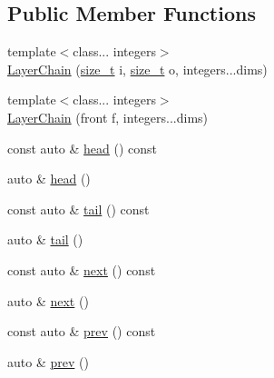 \subsection*{Public Member Functions}
\begin{DoxyCompactItemize}
\item 
{\footnotesize template$<$class... integers$>$ }\\\hyperlink{structBC_1_1nn_1_1LayerChain_3_01index_00_01derived_00_01front_00_01lst_8_8_8_01_4_a1d7ae6582084581c3db8ab7cebfafa28}{Layer\+Chain} (\hyperlink{namespaceBC_a6007cbc4eeec401a037b558910a56173}{size\+\_\+t} i, \hyperlink{namespaceBC_a6007cbc4eeec401a037b558910a56173}{size\+\_\+t} o, integers...\+dims)
\item 
{\footnotesize template$<$class... integers$>$ }\\\hyperlink{structBC_1_1nn_1_1LayerChain_3_01index_00_01derived_00_01front_00_01lst_8_8_8_01_4_a9bf960d13c48a534e207921ac350e80a}{Layer\+Chain} (front f, integers...\+dims)
\item 
const auto \& \hyperlink{structBC_1_1nn_1_1LayerChain_3_01index_00_01derived_00_01front_00_01lst_8_8_8_01_4_ac06e3afc74a9307d2bff9cdab17a0d0f}{head} () const 
\item 
auto \& \hyperlink{structBC_1_1nn_1_1LayerChain_3_01index_00_01derived_00_01front_00_01lst_8_8_8_01_4_ab596e7fe8215a1c8b626c7557bb6069a}{head} ()
\item 
const auto \& \hyperlink{structBC_1_1nn_1_1LayerChain_3_01index_00_01derived_00_01front_00_01lst_8_8_8_01_4_a3422483f822137c0493d3465460c2d1b}{tail} () const 
\item 
auto \& \hyperlink{structBC_1_1nn_1_1LayerChain_3_01index_00_01derived_00_01front_00_01lst_8_8_8_01_4_a2d8df2a9e78badff34fcb2c673b8b37e}{tail} ()
\item 
const auto \& \hyperlink{structBC_1_1nn_1_1LayerChain_3_01index_00_01derived_00_01front_00_01lst_8_8_8_01_4_a40cc47631d3eb1fd06e14b1025743ba5}{next} () const 
\item 
auto \& \hyperlink{structBC_1_1nn_1_1LayerChain_3_01index_00_01derived_00_01front_00_01lst_8_8_8_01_4_ad3d7e2d13dc59b556260e5949c8183bb}{next} ()
\item 
const auto \& \hyperlink{structBC_1_1nn_1_1LayerChain_3_01index_00_01derived_00_01front_00_01lst_8_8_8_01_4_a07a523bf8656f171480e461fb0f811a4}{prev} () const 
\item 
auto \& \hyperlink{structBC_1_1nn_1_1LayerChain_3_01index_00_01derived_00_01front_00_01lst_8_8_8_01_4_aedef23077e8fc8012b545f1203e0175f}{prev} ()

\end{DoxyCompactItemize}
